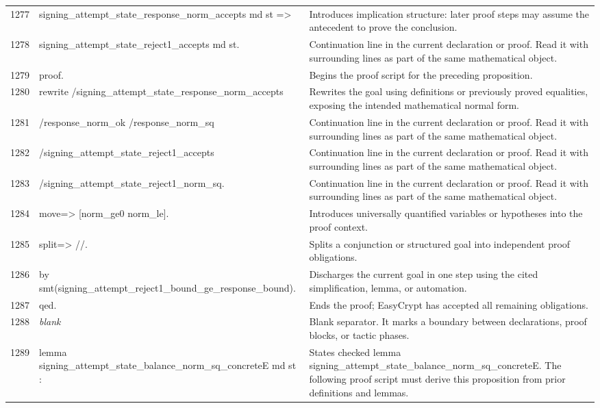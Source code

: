 \documentclass[10pt]{article}
\begin{document}
\begin{longtable}{r L{0.53\textwidth} L{0.37\textwidth}}
1277 & {\ttfamily\scriptsize   signing\_attempt\_state\_response\_norm\_accepts md st =>} & Introduces implication structure: later proof steps may assume the antecedent to prove the conclusion. \\
1278 & {\ttfamily\scriptsize   signing\_attempt\_state\_reject1\_accepts md st.} & Continuation line in the current declaration or proof.  Read it with surrounding lines as part of the same mathematical object. \\
1279 & {\ttfamily\scriptsize proof.} & Begins the proof script for the preceding proposition. \\
1280 & {\ttfamily\scriptsize rewrite /signing\_attempt\_state\_response\_norm\_accepts} & Rewrites the goal using definitions or previously proved equalities, exposing the intended mathematical normal form. \\
1281 & {\ttfamily\scriptsize         /response\_norm\_ok /response\_norm\_sq} & Continuation line in the current declaration or proof.  Read it with surrounding lines as part of the same mathematical object. \\
1282 & {\ttfamily\scriptsize         /signing\_attempt\_state\_reject1\_accepts} & Continuation line in the current declaration or proof.  Read it with surrounding lines as part of the same mathematical object. \\
1283 & {\ttfamily\scriptsize         /signing\_attempt\_state\_reject1\_norm\_sq.} & Continuation line in the current declaration or proof.  Read it with surrounding lines as part of the same mathematical object. \\
1284 & {\ttfamily\scriptsize move=> [norm\_ge0 norm\_le].} & Introduces universally quantified variables or hypotheses into the proof context. \\
1285 & {\ttfamily\scriptsize split=> //.} & Splits a conjunction or structured goal into independent proof obligations. \\
1286 & {\ttfamily\scriptsize by smt(signing\_attempt\_reject1\_bound\_ge\_response\_bound).} & Discharges the current goal in one step using the cited simplification, lemma, or automation. \\
1287 & {\ttfamily\scriptsize qed.} & Ends the proof; EasyCrypt has accepted all remaining obligations. \\
1288 & {\ttfamily\scriptsize \emph{blank}} & Blank separator.  It marks a boundary between declarations, proof blocks, or tactic phases. \\
1289 & {\ttfamily\scriptsize lemma signing\_attempt\_state\_balance\_norm\_sq\_concreteE md st :} & States checked lemma signing\_attempt\_state\_balance\_norm\_sq\_concreteE.  The following proof script must derive this proposition from prior definitions and lemmas. \\

\end{longtable}
\end{document}
